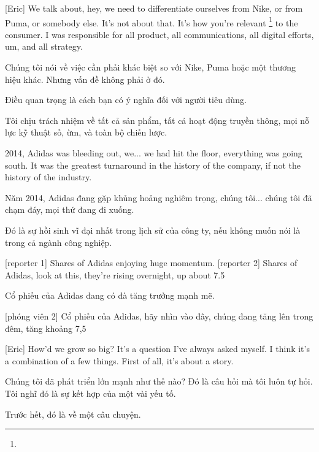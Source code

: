 \documentclass[a4paper]{article}
\begin{document}
	
	[Eric] We talk about, hey, we need to differentiate ourselves from Nike, or from Puma, or somebody else. It's not about that.
	It's how you're relevant \footnote{} to the consumer. I was responsible for all product, all communications, all digital efforts, um, and all strategy.
	
	\begin{vietnamese-v2}
		[Eric] Chúng tôi nói về việc cần phải khác biệt so với Nike, Puma hoặc một thương hiệu khác. Nhưng vấn đề không phải ở đó.
		
		Điều quan trọng là cách bạn có ý nghĩa đối với người tiêu dùng.
		
		Tôi chịu trách nhiệm về tất cả sản phẩm, tất cả hoạt động truyền thông, mọi nỗ lực kỹ thuật số, ừm, và toàn bộ chiến lược.
	\end{vietnamese-v2}
	
	2014, Adidas was bleeding out, we... we had hit the floor, everything was going south.
	It was the greatest turnaround in the history of the company, if not the history of the industry.

	\begin{vietnamese-v2}
		Năm 2014, Adidas đang gặp khủng hoảng nghiêm trọng, chúng tôi... chúng tôi đã chạm đáy, mọi thứ đang đi xuống.  
		
		Đó là sự hồi sinh vĩ đại nhất trong lịch sử của công ty, nếu không muốn nói là trong cả ngành công nghiệp.
	\end{vietnamese-v2}

	[reporter 1] Shares of Adidas enjoying huge momentum.
	[reporter 2] Shares of Adidas, look at this, they're rising overnight, up about 7.5%
	
	\begin{vietnamese-v2}
		 Cổ phiếu của Adidas đang có đà tăng trưởng mạnh mẽ.
		
		[phóng viên 2] Cổ phiếu của Adidas, hãy nhìn vào đây, chúng đang tăng lên trong đêm, tăng khoảng 7,5%
	\end{vietnamese-v2}
	
	
	[Eric] How'd we grow so big? It's a question I've always asked myself. I think it's a combination of a few things.
	First of all, it's about a story. 
	
	\begin{vietnamese-v2}
		[Eric] Chúng tôi đã phát triển lớn mạnh như thế nào? Đó là câu hỏi mà tôi luôn tự hỏi. Tôi nghĩ đó là sự kết hợp của một vài yếu tố.
		
		Trước hết, đó là về một câu chuyện.
	\end{vietnamese-v2}
	
\end{document}
